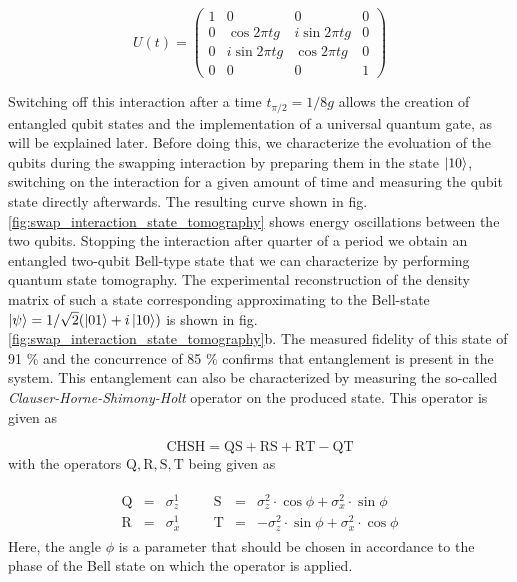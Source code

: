 \begin{equation}
	U(t)  =  \left( \begin{array}{cccc} 1 & 0 & 0 & 0 \\ 0 & \cos{2 \pi t g} & i\sin{2 \pi t g} & 0 \\ 0 & i\sin{2 \pi t g} & \cos{2 \pi t g} & 0 \\ 0 & 0 & 0 & 1 \end{array} \right) \label{eq:swap_evolution_operator}
\end{equation}


Switching off this interaction after a time $t_{\pi/2} = 1/8 g$ allows the creation of entangled qubit states and the implementation of a universal quantum gate, as will be explained later. Before doing this, we characterize the evoluation of the qubits during the swapping interaction by preparing them in the state $\left| 10 \right>$, switching on the interaction for a given amount of time and measuring the qubit state directly afterwards. The resulting curve shown in fig. \ref{fig:swap_interaction_state_tomography} shows energy oscillations between the two qubits. Stopping the interaction after quarter of a period we obtain an entangled two-qubit Bell-type state that we can characterize by performing quantum state tomography. The experimental reconstruction of the density matrix of such a state corresponding approximating to the Bell-state $\left| \psi \right> = 1/\sqrt{2}(\left| 01 \right>+i\left| 10 \right>)$ is shown in fig. \ref{fig:swap_interaction_state_tomography}b. The measured fidelity of this state of 91 \% and the concurrence of 85 \% confirms that entanglement is present in the system. This entanglement can also be characterized by measuring the so-called {\it Clauser-Horne-Shimony-Holt} operator \citep{clauser_proposed_1969} on the produced state. This operator is given as

\begin{equation}
\mathrm{CHSH} = \mathrm{QS}+\mathrm{RS}+\mathrm{RT}-\mathrm{QT}
\end{equation}
with the operators $\mathrm{Q,R,S,T}$ being given as

\begin{eqnarray}
	\begin{array}{cccccccc}
		\mathrm{Q} & = & \sigma_z^1 &&& \mathrm{S} & = & \sigma_z^2\cdot \cos{\phi}+\sigma_x^2 \cdot \sin{\phi} \\
		\mathrm{R} & = & \sigma_x^1 &&& \mathrm{T} & = & -\sigma_z^2\cdot \sin{\phi}+\sigma_x^2 \cdot \cos{\phi}
	\end{array}
\end{eqnarray} 
Here, the angle $\phi$ is a parameter that should be chosen in accordance to the phase of the Bell state on which the operator is applied.

